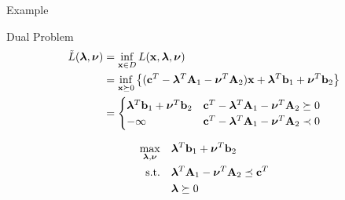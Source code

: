 \documentclass[12pt,notes,mathserif]{beamer}
\begin{document}
\begin{frame}
	{Example}
	\begin{block}{Dual Problem}
		\vspace{-1em}
		\begin{equation*}
			\begin{aligned}
				\tilde{L}(\boldsymbol{\lambda}, \boldsymbol{\nu} ) & = \inf_{\mathbf{x} \in D} L(\mathbf{x}, \boldsymbol{\lambda}, \boldsymbol{\nu})                                                                                \\
				                           & = \inf_{\mathbf{x} \succeq 0} \left\{ (\mathbf{c}^T - \boldsymbol{\lambda}^T \mathbf{A}_1 - \boldsymbol{\nu}^T \mathbf{A}_2 ) \mathbf{x} + \boldsymbol{\lambda}^T \mathbf{b}_1 + \boldsymbol{\nu}^T \mathbf{b}_2 \right\} \\
				                           & = \begin{cases}
					\boldsymbol{\lambda}^T \mathbf{b}_1 + \boldsymbol{\nu}^T \mathbf{b}_2 & \mathbf{c}^T - \boldsymbol{\lambda}^T \mathbf{A}_1 - \boldsymbol{\nu}^T \mathbf{A}_2 \succeq 0 \\
					-\infty                         & \mathbf{c}^T - \boldsymbol{\lambda}^T \mathbf{A}_1 - \boldsymbol{\nu}^T \mathbf{A}_2 \prec 0   \\
				\end{cases}                                                                                             \\
			\end{aligned}
		\end{equation*}

		\begin{equation}
			\begin{aligned}
				\max_{\boldsymbol{\lambda}, \boldsymbol{\nu}} \quad        & \boldsymbol{\lambda}^T \mathbf{b}_1 + \boldsymbol{\nu}^T \mathbf{b}_2               \\
				\textrm{s.t.} \quad & \boldsymbol{\lambda}^T \mathbf{A}_1 - \boldsymbol{\nu}^T \mathbf{A}_2 \preceq \mathbf{c}^T \\
				                    & \boldsymbol{\lambda} \succeq 0                            \\
			\end{aligned}
		\end{equation}

	\end{block}
\end{frame}
\end{document}
